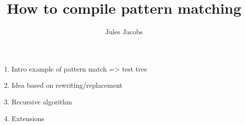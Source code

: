 \documentclass[a4paper, 11pt]{article}
\title{How to compile pattern matching}
\author{Jules Jacobs}
\theoremstyle{definition}
\begin{document}
\maketitle

\begin{enumerate}
  \item Intro example of pattern match => test tree
  \item Idea based on rewriting/replacement
  \item Recursive algorithm
  \item Extensions
\end{enumerate}
\end{document}

